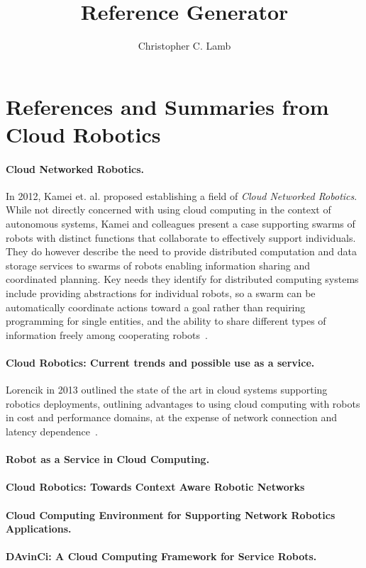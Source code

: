 \documentclass[10pt,letterpaper]{article}
\author{Christopher C. Lamb}
\title{Reference Generator}
\begin{document}
\section{References and Summaries from Cloud Robotics}

\paragraph{Cloud Networked Robotics.} In 2012, Kamei et. al. proposed establishing a field of {\sl Cloud Networked Robotics}.  While not directly concerned with using cloud computing in the context of autonomous systems, Kamei and colleagues present a case supporting swarms of robots with distinct functions that collaborate to effectively support individuals.  They do however describe the need to provide distributed computation and data storage services to swarms of robots enabling information sharing and coordinated planning.  Key needs they identify for distributed computing systems include providing abstractions for individual robots, so a swarm can be automatically coordinate actions toward a goal rather than requiring programming for single entities, and the ability to share different types of information freely among cooperating robots~\cite{KaNiHaSa:12}.

\paragraph{Cloud Robotics: Current trends and possible use as a service.} Lorencik in 2013 outlined the state of the art in cloud systems supporting robotics deployments, outlining advantages to using cloud computing with robots in cost and performance domains, at the expense of network connection and latency dependence~\cite{LoSi:13}.

\paragraph{Robot as a Service in Cloud Computing.}

\cite{YiZhGa:10}

\paragraph{Cloud Robotics: Towards Context Aware Robotic Networks}

\cite{QuMeDi:11}

\paragraph{Cloud Computing Environment for Supporting Network Robotics Applications.}

\cite{AgOlFePa:11}

\paragraph{DAvinCi: A Cloud Computing Framework for Service Robots.}

\cite{ArEnLiWu:10}



\end{document}

